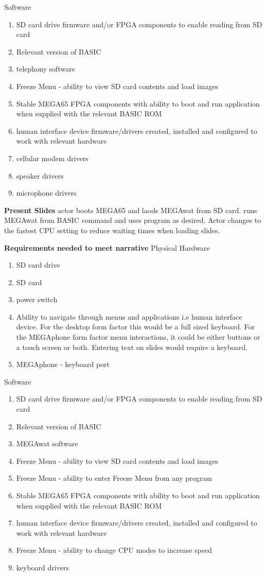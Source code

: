 Software
\begin{enumerate}
\item SD card drive firmware and/or FPGA components to enable reading from SD card
\item Relevant version of BASIC 
\item telephony software
\item Freeze Menu - ability to view SD card contents and load images
\item Stable MEGA65 FPGA components with ability to boot and run application when supplied with the relevant BASIC ROM
\item human interface device firmware/drivers created, installed and configured to work with relevant hardware
\item cellular modem drivers
\item speaker drivers
\item microphone drivers
\end{enumerate}

\textbf{Present Slides}
actor boots MEGA65 and laods MEGAwat from SD card. runs MEGAwat from BASIC command and uses program as desired. Actor changes to the fastest CPU setting to reduce waiting times when loading slides.

\textbf{Requirements needed to meet narrative}
Physical Hardware
\begin{enumerate}
\item SD card drive
\item SD card
\item power switch
\item Ability to navigate through menus and applications i.e human interface device. For the desktop form factor this would be a full sized keyboard. For the MEGAphone form factor menu interactions, it could be either buttons or a touch screen or both. Entering text on slides would require a keyboard.
\item MEGAphone - keyboard port
\end{enumerate}

Software
\begin{enumerate}
\item SD card drive firmware and/or FPGA components to enable reading from SD card
\item Relevant version of BASIC 
\item MEGAwat software
\item Freeze Menu - ability to view SD card contents and load images
\item Freeze Menu - ability to enter Freeze Menu from any program
\item Stable MEGA65 FPGA components with ability to boot and run application when supplied with the relevant BASIC ROM
\item human interface device firmware/drivers created, installed and configured to work with relevant hardware
\item Freeze Menu - ability to change CPU modes to increase speed
\item keyboard drivers
\end{enumerate}

